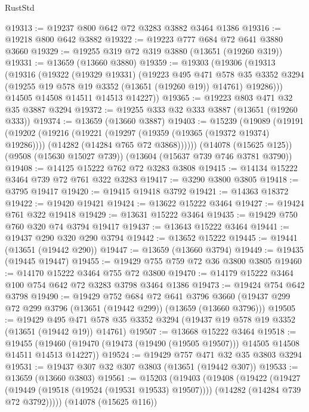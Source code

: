 \begin{lexlean}{RustStd}
\begin{coremodule}
@19313 := @19237 @800 @642 @72 @3283 @3882 @3464 @1386
@19316 := @19218 @800 @642 @3882
@19322 := @19223 @777 @684 @72 @641 @3880 @3660
@19329 := @19255 @319 @72 @319 @3880 (@13651 (@19260 @319))
@19331 := @13659 (@13660 @3880)
@19359 := @19303
    (@19306
      (@19313
        (@19316
          (@19322
            (@19329 @19331)
            (@19223
              @495
              @471
              @578
              @35
              @3352
              @3294
              (@19255 @19 @578 @19 @3352 (@13651 (@19260 @19)) @14761)
              @19286)))
        @14505
        @14508
        @14511
        @14513
        @14227))
@19365 := @19223 @803 @471 @32 @35 @3887 @3294
@19372 := @19255 @333 @32 @333 @3887 (@13651 (@19260 @333))
@19374 := @13659 (@13660 @3887)
@19403 := @15239
    (@19089
      (@19191
        (@19202
          (@19216
            (@19221 (@19297 (@19359 (@19365 (@19372 @19374) @19286))))
            (@14282 (@14284 @765 @72 @3868))))))
    (@14078 (@15625 @125))
    (@9508 (@15630 @15027 @739))
    (@13604 (@15637 @739 @746 @3781 @3790))
@19408 := @14125 @15222 @762 @72 @3283 @3808
@19415 := @14134 @15222 @3464 @739 @72 @761 @322 @3283
@19417 := @3290 @3800 @3805
@19418 := @3795 @19417
@19420 := @19415 @19418 @3792
@19421 := @14363 @18372
@19422 := @19420 @19421
@19424 := @13622 @15222 @3464
@19427 := @19424 @761 @322 @19418
@19429 := @13631 @15222 @3464
@19435 := @19429 @750 @760 @320 @74 @3794 @19417
@19437 := @13643 @15222 @3464
@19441 := @19437 @290 @320 @290 @3794
@19442 := @13652 @15222
@19445 := @19441 (@13651 (@19442 @290))
@19447 := @13659 (@13660 @3794)
@19449 := @19435 (@19445 @19447)
@19455 := @19429 @755 @759 @72 @36 @3800 @3805
@19460 := @14170 @15222 @3464 @755 @72 @3800
@19470 := @14179 @15222 @3464 @100 @754 @642 @72 @3283 @3798 @3464 @1386
@19473 := @19424 @754 @642 @3798
@19490 := @19429
    @752
    @684
    @72
    @641
    @3796
    @3660
    (@19437 @299 @72 @299 @3796 (@13651 (@19442 @299)) (@13659 (@13660 @3796)))
@19505 := @19429
    @495
    @471
    @578
    @35
    @3352
    @3294
    (@19437 @19 @578 @19 @3352 (@13651 (@19442 @19)) @14761)
@19507 := @13668 @15222 @3464
@19518 := @19455
    (@19460 (@19470 (@19473 (@19490 (@19505 @19507))) @14505 @14508 @14511 @14513 @14227))
@19524 := @19429 @757 @471 @32 @35 @3803 @3294
@19531 := @19437 @307 @32 @307 @3803 (@13651 (@19442 @307))
@19533 := @13659 (@13660 @3803)
@19561 := @15203
    (@19403
      (@19408
        (@19422
          (@19427 (@19449 (@19518 (@19524 (@19531 @19533) @19507))))
          (@14282 (@14284 @739 @72 @3792)))))
    (@14078 (@15625 @116))

\end{coremodule}
\end{lexlean}
